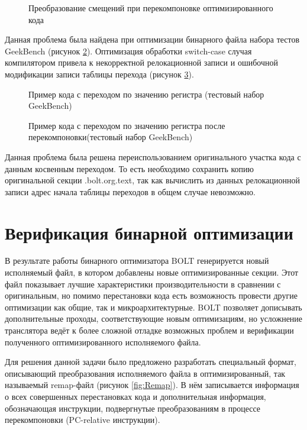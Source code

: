 \begin{figure}[!h]
    \centerfloat{
        \texttt{[image: jt6]}
    }
    \caption{Преобразование смещений при перекомпоновке оптимизированного кода}\label{fig:SC5}
\end{figure}

Данная проблема была найдена при оптимизации бинарного файла набора тестов GeekBench (рисунок \cref{fig:SCEx1}). Оптимизация обработки switch-case случая компилятором привела к некорректной релокационной записи и ошибочной модификации записи таблицы перехода (рисунок \cref{fig:SCEx2}).

\begin{figure}[!h]
    \centerfloat{
        \texttt{[image: jt7]}
    }
    \caption{Пример кода с переходом по значению регистра (тестовый набор GeekBench)}\label{fig:SCEx1}
\end{figure}

\begin{figure}[!h]
    \centerfloat{
        \texttt{[image: jt8]}
    }
    \caption{Пример кода с переходом по значению регистра после перекомпоновки(тестовый набор GeekBench)}\label{fig:SCEx2}
\end{figure}

Данная проблема была решена переиспользованием оригинального участка кода с данным косвенным переходом. То есть необходимо сохранить копию оригинальной секции .bolt.org.text, так как вычислить из данных релокационной записи адрес начала таблицы переходов в общем случае невозможно.

\section{Верификация бинарной оптимизации}\label{sec:ch3/sect3}
В результате работы бинарного оптимизатора BOLT генерируется новый исполняемый файл, в котором добавлены новые оптимизированные секции. Этот файл показывает лучшие характеристики производительности в сравнении с оригинальным, но помимо перестановки кода есть возможность провести другие оптимизации как общие, так и микроархитектурные. BOLT позволяет дописывать дополнительные проходы, соответствующие новым оптимизациям, но усложнение транслятора ведёт к более сложной отладке возможных проблем и верификации полученного оптимизированного исполняемого файла.

Для решения данной задачи было предложено разработать специальный формат, описывающий преобразования исполняемого файла в оптимизированный, так называемый remap-файл (рисунок \cref{fig:Remap}). В нём записывается информация о всех совершенных перестановках кода и дополнительная информация, обозначающая инструкции, подвергнутые преобразованиям в процессе перекомпоновки (PC-relative инструкции).


